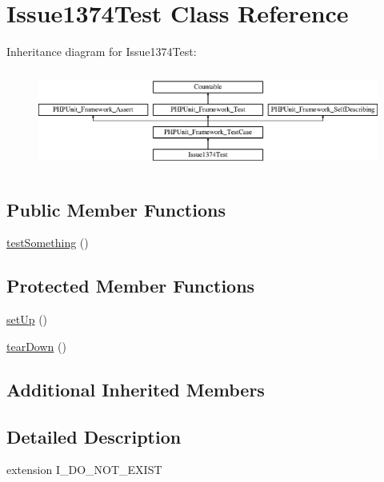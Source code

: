 \hypertarget{class_issue1374_test}{}\section{Issue1374\+Test Class Reference}
\label{class_issue1374_test}
Inheritance diagram for Issue1374\+Test\+:\begin{figure}[H]
\begin{center}
\leavevmode
\includegraphics[height=3.303835cm]{class_issue1374_test}
\end{center}
\end{figure}
\subsection*{Public Member Functions}
\begin{DoxyCompactItemize}
\item 
\mbox{\hyperlink{class_issue1374_test_a0fc4e17369bc9607ebdd850d9eda8167}{test\+Something}} ()
\end{DoxyCompactItemize}
\subsection*{Protected Member Functions}
\begin{DoxyCompactItemize}
\item 
\mbox{\hyperlink{class_issue1374_test_a0bc688732d2b3b162ffebaf7812e78da}{set\+Up}} ()
\item 
\mbox{\hyperlink{class_issue1374_test_a80fe3d17e658907fc75346a0ec9d6fc7}{tear\+Down}} ()
\end{DoxyCompactItemize}
\subsection*{Additional Inherited Members}


\subsection{Detailed Description}
extension I\+\_\+\+D\+O\+\_\+\+N\+O\+T\+\_\+\+E\+X\+I\+ST 

